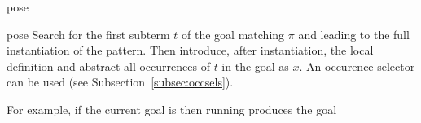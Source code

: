 \begin{tactic}[pose $\;x\!$ := $\;\pi$]{pose}
  \begin{tsyntax}[empty]{pose}
  Search for the first subterm $t$ of the goal matching $\pi$ and
  leading to the full instantiation of the pattern. Then introduce,
  after instantiation, the local definition  and abstract
  all occurrences of $t$ in the goal as $x$. An occurence
  selector can be used (see Subsection~\ref{subsec:occsels}).

  For example, if the current goal is
   then
  running 
  produces the goal
  \end{tsyntax}
\end{tactic}
